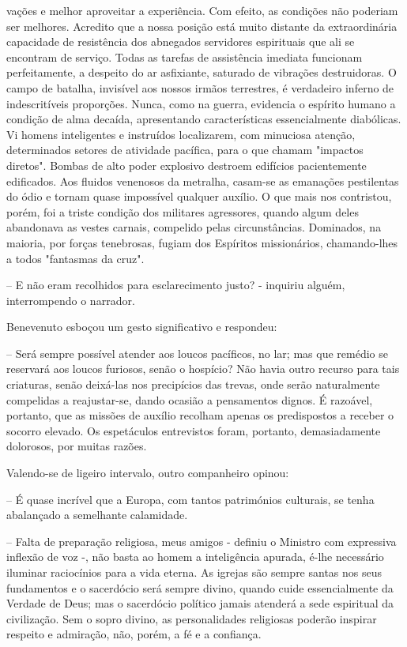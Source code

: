 \documentclass[portuguese,12pt,a4paper]{scrbook}
\begin{document}
	
	vações e melhor aproveitar a experiência. Com efeito, as condições não poderiam ser melhores. Acredito que a nossa posição está muito distante da extraordinária capacidade de resistência dos abnegados servidores espirituais que ali se encontram de serviço. Todas as tarefas de assistência imediata funcionam perfeitamente, a despeito do ar asfixiante, saturado de vibrações destruidoras. O campo de batalha, invisível aos nossos irmãos terrestres, é verdadeiro inferno de indescritíveis proporções. Nunca, como na guerra, evidencia o espírito humano a condição de alma decaída, apresentando características essencialmente diabólicas. Vi homens inteligentes e instruídos localizarem, com minuciosa atenção, determinados setores de atividade pacífica, para o que chamam "impactos diretos". Bombas de alto poder explosivo destroem edifícios pacientemente edificados. Aos fluidos venenosos da metralha, casam-se as emanações pestilentas do ódio e tornam quase impossível qualquer auxílio. O que mais nos contristou, porém, foi a triste condição dos militares agressores, quando algum deles abandonava as vestes carnais, compelido pelas circunstâncias. Dominados, na maioria, por forças tenebrosas, fugiam dos Espíritos missionários, chamando-lhes a todos "fantasmas da cruz".
	
	– E não eram recolhidos para esclarecimento justo? - inquiriu alguém, interrompendo o narrador.
	
	Benevenuto esboçou um gesto significativo e respondeu:
	
	– Será sempre possível atender aos loucos pacíficos, no lar; mas que remédio se reservará aos loucos furiosos, senão o hospício? Não havia outro recurso para tais criaturas, senão deixá-las nos precipícios das trevas, onde serão naturalmente compelidas a reajustar-se, dando ocasião a pensamentos dignos. É razoável, portanto, que as missões de auxílio recolham apenas os predispostos a receber o socorro elevado. Os espetáculos entrevistos foram, portanto, demasiadamente dolorosos, por muitas razões.
	
	
	Valendo-se de ligeiro intervalo, outro companheiro opinou:
	
	– É quase incrível que a Europa, com tantos patrimónios culturais, se tenha abalançado a semelhante calamidade.
	
	– Falta de preparação religiosa, meus amigos - definiu o Ministro com expressiva inflexão de voz -, não basta ao homem a inteligência apurada, é-lhe necessário iluminar raciocínios para a vida eterna. As igrejas são sempre santas nos seus fundamentos e o sacerdócio será sempre divino, quando cuide essencialmente da Verdade de Deus; mas o sacerdócio político jamais atenderá a sede espiritual da civilização. Sem o sopro divino, as personalidades religiosas poderão inspirar respeito e admiração, não, porém, a fé e a confiança.
	
\end{document}
